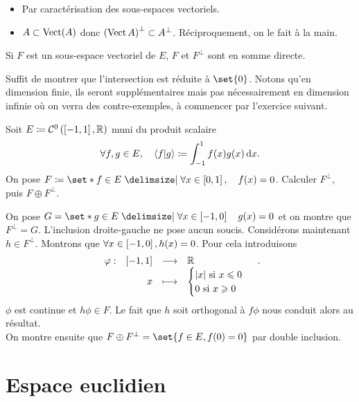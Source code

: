 \documentclass{magnolia}
\begin{document}
\begin{preuve}
\begin{itemize}
\item Par caractérisation des sous-espaces vectoriels.
\item $A\subset \operatorname{Vect}(A)$ donc $\left(\operatorname{Vect} A\right)^{\perp}\subset A^{\perp}$. Réciproquement, on le fait à la main.
\end{itemize}
\end{preuve}

\begin{remarqueUnique}
\remarque Si $F$ est un sous-espace vectoriel de $E$, $F$ et $F^\perp$ sont en
  somme directe.
\end{remarqueUnique}

\begin{sol}
Suffit de montrer que l'intersection est réduite à $\set{0}$. Notons qu'en dimension finie, ils seront supplémentaires mais pas nécessairement en dimension infinie où on verra des contre-exemples, à commencer par l'exercice suivant.
\end{sol}

\begin{exoUnique}
\exo Soit $E\coloneqq\mathcal{C}^{0}\left(\left[-1,1\right],\mathbb{R}\right)$ muni du produit scalaire
  \[\forall f,g\in E ,\quad \left\langle {f}\middle|{g}\right\rangle\coloneqq\int_{-1}^{1} f(x)g(x)\,\text{d}x.\]
  On pose $F\defeq\enstq{f\in E}{\forall x\in\interf{0}{1} \qsep f(x)=0}$.
  Calculer $F^\perp$, puis $F\oplus F^\perp$.
  \begin{sol}
  On pose $G=\enstq{g\in E}{\forall x\in\interf{-1}{0} \quad g(x)=0}$ et on montre que $F^\perp=G$. L'inclusion droite-gauche ne pose aucun soucis. Considérons maintenant $h\in F^\perp$. Montrons que $\forall x \in \left[-1,0\right], h(x)=0$. Pour cela introduisons $$\begin{array}[t]{lrcl} \displaystyle{\varphi} : & \displaystyle{\left[-1,1\right]} & \longrightarrow & \displaystyle{\mathbb{R}} \\ & \displaystyle{x} & \longmapsto & \displaystyle{\begin{cases}|x| \text{ si } x\leqslant0\\0 \text{ si } x\geqslant0\end{cases}} \end{array}.$$ $\phi$ est continue et $h\phi \in F$. Le fait que $h$ soit orthogonal à $f\phi$ nous conduit alors au résultat.\\
  On montre ensuite que $F\oplus F^\perp=\set{f\in E, f(0)=0}$ par double inclusion.
  \end{sol}
\end{exoUnique}


\section{Espace euclidien}
\end{document}
